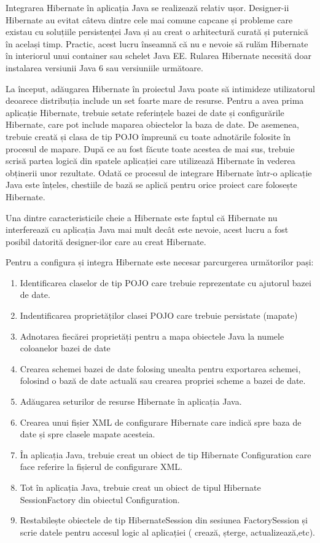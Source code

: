 \documentclass[12pt]{book}
\begin{document}
Integrarea Hibernate în aplicația Java se realizează relativ ușor. Designer-ii Hibernate au evitat câteva dintre cele mai comune capcane și probleme care existau cu soluțiile persistenței Java și au creat o arhitectură curată și puternică în același timp. Practic, acest lucru înseamnă că nu e nevoie să rulăm Hibernate în interiorul unui container sau schelet Java EE. Rularea Hibernate necesită doar instalarea versiunii Java 6 sau versiuniile următoare.

La început, adăugarea Hibernate în proiectul Java poate să intimideze utilizatorul deoarece distribuția include un set foarte mare de resurse. Pentru a avea prima aplicație Hibernate, trebuie setate referințele bazei de date și configurările Hibernate, care pot include maparea obiectelor la baza de date. De asemenea, trebuie creată și clasa de tip POJO împreună cu toate adnotările folosite în procesul de mapare. După ce au fost făcute toate acestea de mai sus, trebuie scrisă partea logică din spatele aplicației care utilizează Hibernate în vederea obținerii unor rezultate. Odată ce procesul de integrare Hibernate într-o aplicație Java este înțeles, chestiile de bază se aplică pentru orice proiect care folosește Hibernate.

Una dintre caracteristicile cheie a Hibernate este faptul că Hibernate nu interferează cu aplicația Java mai mult decât este nevoie, acest lucru a fost posibil datorită designer-ilor care au creat Hibernate. 

Pentru a configura și integra Hibernate este necesar parcurgerea următorilor pași:
\begin{addmargin}[4em]{1em}
	\begin{enumerate}
	\item Identificarea claselor de tip POJO care trebuie reprezentate cu ajutorul bazei de date.
	\item Indentificarea proprietăților clasei POJO care trebuie persistate (mapate)
	\item Adnotarea fiecărei proprietăți pentru a mapa obiectele Java la numele coloanelor bazei de date
	\item Crearea schemei bazei de date folosing unealta pentru exportarea schemei, folosind o bază de date actuală sau crearea propriei scheme a bazei de date.
	\item Adăugarea seturilor de resurse Hibernate în aplicația Java.
	\item Crearea unui fișier XML de configurare Hibernate care indică spre baza de date și spre clasele mapate acesteia.
	\item În aplicația Java, trebuie creat un obiect de tip Hibernate Configuration care face referire la fișierul de configurare XML.
	\item Tot în aplicația Java, trebuie creat un obiect de tipul Hibernate SessionFactory din obiectul Configuration.
	\item Restabilește obiectele de tip HibernateSession din sesiunea FactorySession și scrie datele pentru accesul logic al aplicației ( crează, șterge, actualizează,etc).\cite{BeginningHibernate}
\end{enumerate}
\end{addmargin}
\end{document}
